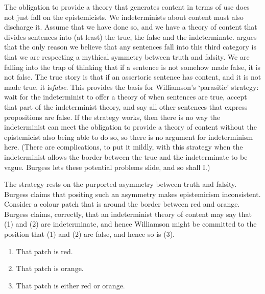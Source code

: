 The obligation to provide a theory that generates content in terms of use does not just fall on the epistemicists. We indeterminists about content must also discharge it. Assume that we have done so, and we have a theory of content that divides sentences into (at least) the true, the false and the indeterminate. \cite[207-208]{Williamson1994-WILV} argues that the only reason we believe that any sentences fall into this third category is that we are respecting a mythical symmetry between truth and falsity. We are falling into the trap of thinking that if a sentence is not somehow made false, it is not false. The true story is that if an assertoric sentence has content, and it is not made true, it is\textit{false}. This provides the basis for Williamson's `parasitic' strategy: wait for the indeterminist to offer a theory of when sentences are true, accept that part of the indeterminist theory, and say all other sentences that express propositions are false. If the strategy works, then there is no way the indeterminist can meet the obligation to provide a theory of content without the epistemicist also being able to do so, so there is no argument for indeterminism here. (There are complications, to put it mildly, with this strategy when the indeterminist allows the border between the true and the indeterminate to be vague. Burgess lets these potential problems slide, and so shall I.)

The strategy rests on the purported asymmetry between truth and falsity. Burgess claims that positing such an asymmetry makes epistemicism inconsistent. Consider a colour patch that is around the border between red and orange. Burgess claims, correctly, that an indeterminist theory of content may say that (1) and (2) are indeterminate, and hence Williamson might be committed to the position that (1) and (2) are false, and hence so is (3).

\begin{enumerate}
\renewcommand{\labelenumi}{(\arabic{enumi})}
\item That patch is red.
\item That patch is orange.
\item That patch is either red or orange.
\end{enumerate}


